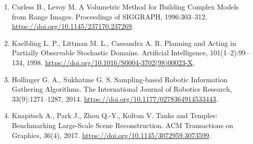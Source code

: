 \documentclass[11pt,a4paper]{article}
\begin{document}
\begin{enumerate}
\item
  Curless B., Levoy M. A Volumetric Method for Building Complex Models from Range Images. Proceedings of SIGGRAPH, 1996:303--312. \url{https://doi.org/10.1145/237170.237269}.
\item
  Kaelbling L. P., Littman M. L., Cassandra A. R. Planning and Acting in Partially Observable Stochastic Domains. Artificial Intelligence, 101(1--2):99--134, 1998. \url{https://doi.org/10.1016/S0004-3702(98)00023-X}.
\item
  Hollinger G. A., Sukhatme G. S. Sampling-based Robotic Information Gathering Algorithms. The International Journal of Robotics Research, 33(9):1271--1287, 2014. \url{https://doi.org/10.1177/0278364914533443}.
\item
  Knapitsch A., Park J., Zhou Q.-Y., Koltun V. Tanks and Temples: Benchmarking Large-Scale Scene Reconstruction. ACM Transactions on Graphics, 36(4), 2017. \url{https://doi.org/10.1145/3072959.3073599}.
\end{enumerate}
\end{document}
